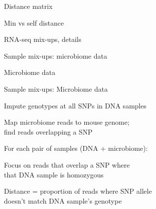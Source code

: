 \documentclass[aspectratio=169,12pt,t]{beamer}
\begin{document}
\begin{frame}[c]{Distance matrix}


\note{
}

\end{frame}

\begin{frame}[c]{Min vs self distance}

\note{
}
\end{frame}

\begin{frame}[c]{RNA-seq mix-ups, details}

\note{
}
\end{frame}



\begin{frame}[c]{}

\centerline{\Large \color{title} Sample mix-ups: microbiome data}

\note{
}

\end{frame}


\begin{frame}[c]{Microbiome data}

\note{
}
\end{frame}

\begin{frame}{Sample mix-ups: Microbiome data}

\bbi
\item Impute genotypes at all SNPs in DNA samples

\item Map microbiome reads to mouse genome;\\ find reads overlapping a SNP

\item For each pair of samples (DNA + microbiome):

  \bi
  \itemsep10pt
  \item Focus on reads that overlap a SNP where \\
        that DNA sample is homozygous

  \item Distance = proportion of reads where SNP allele \\
    \hspace*{16mm} doesn't match DNA sample's genotype
  \ei
\ei

\note{
}
\end{frame}
\end{document}
